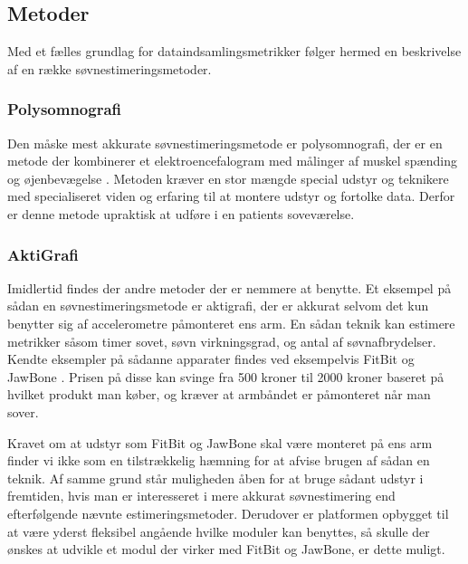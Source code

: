 \subsection{Metoder}
Med et fælles grundlag for dataindsamlingsmetrikker følger hermed en beskrivelse af en række søvnestimeringsmetoder.

\subsubsection{Polysomnografi}
Den måske mest akkurate søvnestimeringsmetode er polysomnografi, der er en metode der kombinerer et elektroencefalogram med målinger af muskel spænding og øjenbevægelse \citep{misc:polysomnografi,misc:polysomnography}.
Metoden kræver en stor mængde special udstyr og teknikere med specialiseret viden og erfaring til at montere udstyr og fortolke data.
Derfor er denne metode upraktisk at udføre i en patients soveværelse.

\subsubsection{AktiGrafi}
Imidlertid findes der andre metoder der er nemmere at benytte.
Et eksempel på sådan en søvnestimeringsmetode er aktigrafi, der er akkurat selvom det kun benytter sig af accelerometre påmonteret ens arm.
En sådan teknik kan estimere metrikker såsom timer sovet, søvn virkningsgrad, og antal af søvnafbrydelser.
Kendte eksempler på sådanne apparater findes ved eksempelvis FitBit og JawBone \citep{misc:fitbitSleepTracking,misc:jawBoneSleepTracking}.
Prisen på disse kan svinge fra 500 kroner til 2000 kroner baseret på hvilket produkt man køber, og kræver at armbåndet er påmonteret når man sover.

Kravet om at udstyr som FitBit og JawBone skal være monteret på ens arm finder vi ikke som en tilstrækkelig hæmning for at afvise brugen af sådan en teknik.
Af samme grund står muligheden åben for at bruge sådant udstyr i fremtiden, hvis man er interesseret i mere akkurat søvnestimering end efterfølgende nævnte estimeringsmetoder.
Derudover er platformen opbygget til at være yderst fleksibel angående hvilke moduler kan benyttes, så skulle der ønskes at udvikle et modul der virker med FitBit og JawBone, er dette muligt.

